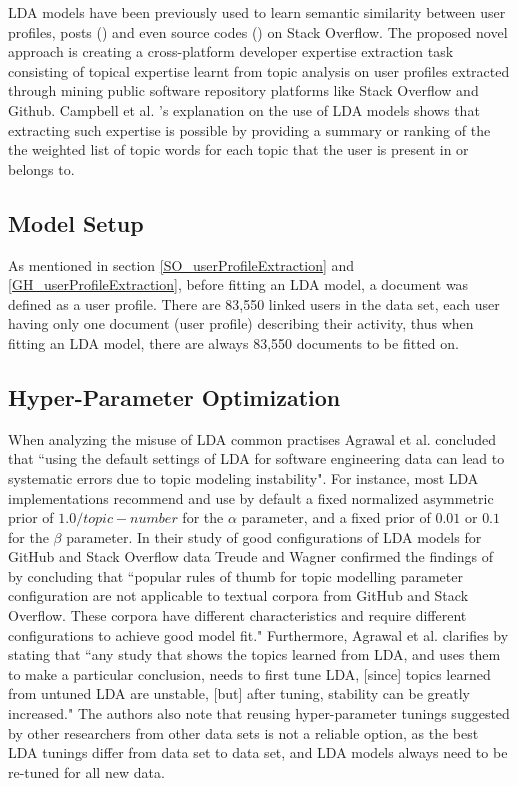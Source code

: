 LDA models have been previously used to learn semantic similarity between user profiles, posts (\cite{tian2013predicting}) and even source codes (\cite{arwan2015source}) on Stack Overflow. The proposed novel approach is creating a cross-platform developer expertise extraction task consisting of topical expertise learnt from topic analysis on user profiles extracted through mining public software repository platforms like Stack Overflow and Github. Campbell et al. \cite{campbell2015latent}'s explanation on the use of LDA models shows that extracting such expertise is possible by providing a summary or ranking of the the weighted list of topic words for each topic that the user is present in or belongs to. 
    
    \subsection{Model Setup}
    
        As mentioned in section \ref{SO_userProfileExtraction} and \ref{GH_userProfileExtraction}, before fitting an LDA model, a document was defined as a user profile. There are 83,550 linked users in the data set, each user having only one document (user profile) describing their activity, thus when fitting an LDA model, there are always 83,550 documents to be fitted on. 
        
        
    
    \subsection{Hyper-Parameter Optimization}
    When analyzing the misuse of LDA common practises Agrawal et al. \cite{agrawal2018wrong} concluded that ``using the default settings of LDA for software engineering data can lead to systematic errors due to topic modeling instability". For instance, most LDA implementations recommend and use by default a fixed normalized asymmetric prior of $1.0 / topic-number$ for the $\alpha$ parameter, and a fixed prior of $0.01$ or $0.1$ for the $\beta$ parameter. In their study of good configurations of LDA models for GitHub and Stack Overflow data Treude and Wagner \cite{treude2019predicting} confirmed the findings of \cite{agrawal2018wrong} by concluding that ``popular rules of thumb for topic modelling parameter configuration are not applicable to textual corpora from GitHub and Stack Overflow. These corpora have different characteristics and require different configurations to achieve good model fit." Furthermore, Agrawal et al. \cite{agrawal2018wrong} clarifies by stating that ``any study that shows the topics learned from LDA, and uses them to make a particular conclusion, needs to first tune LDA,  [since] topics learned from untuned LDA are unstable, [but] after tuning, stability can be greatly increased." The authors also note that reusing hyper-parameter tunings suggested by other researchers from other data sets is not a reliable option, as the best LDA tunings differ from data set to data set, and LDA models always need to be re-tuned for all new data.
    
